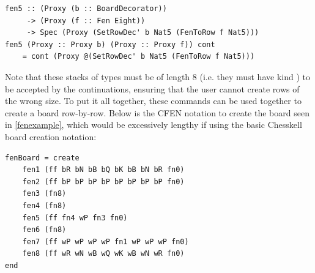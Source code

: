 \begin{lstlisting}
fen5 :: (Proxy (b :: BoardDecorator))
     -> (Proxy (f :: Fen Eight))
     -> Spec (Proxy (SetRowDec' b Nat5 (FenToRow f Nat5)))
fen5 (Proxy :: Proxy b) (Proxy :: Proxy f)) cont
    = cont (Proxy @(SetRowDec' b Nat5 (FenToRow f Nat5)))
\end{lstlisting}

Note that these stacks of  types must be of length 8 (i.e. they must have kind ) to be accepted by the continuations, ensuring that the user cannot create rows of the wrong size. To put it all together, these commands can be used together to create a board row-by-row. Below is the CFEN notation to create the board seen in \cref{fenexample}, which would be excessively lengthy if using the basic Chesskell board creation notation:

\begin{lstlisting}
fenBoard = create
    fen1 (ff bR bN bB bQ bK bB bN bR fn0)
    fen2 (ff bP bP bP bP bP bP bP bP fn0)
    fen3 (fn8)
    fen4 (fn8)
    fen5 (ff fn4 wP fn3 fn0)
    fen6 (fn8)
    fen7 (ff wP wP wP wP fn1 wP wP wP fn0)
    fen8 (ff wR wN wB wQ wK wB wN wR fn0)
end
\end{lstlisting}